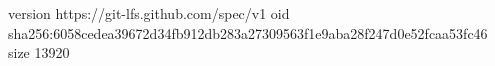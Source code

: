 version https://git-lfs.github.com/spec/v1
oid sha256:6058cedea39672d34fb912db283a27309563f1e9aba28f247d0e52fcaa53fc46
size 13920
